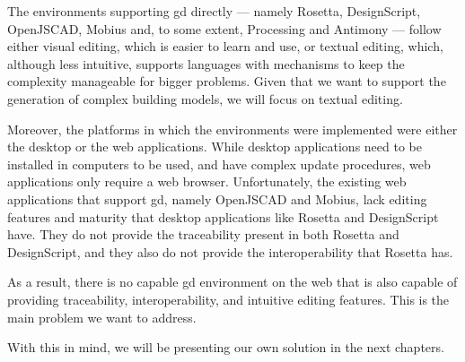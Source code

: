 The environments supporting \gls{gd} directly --- namely Rosetta, DesignScript, OpenJSCAD, Mobius and, to some extent, Processing and Antimony --- follow either visual editing, which is easier to learn and use, or textual editing, which, although less intuitive, supports languages with mechanisms to keep the complexity manageable for bigger problems.
Given that we want to support the generation of complex building models, we will focus on textual editing.

Moreover, the platforms in which the environments were implemented were either the desktop or the web applications.
While desktop applications need to be installed in computers to be used, and have complex update procedures, web applications only require a web browser.
Unfortunately, the existing web applications that support \gls{gd}, namely OpenJSCAD and Mobius, lack editing features and maturity that desktop applications like Rosetta and DesignScript have.
They do not provide the traceability present in both Rosetta and DesignScript, and they also do not provide the interoperability that Rosetta has.

As a result, there is no capable \gls{gd} environment on the web that is also capable of providing traceability, interoperability, and intuitive editing features.
This is the main problem we want to address.

With this in mind, we will be presenting our own solution in the next chapters.






